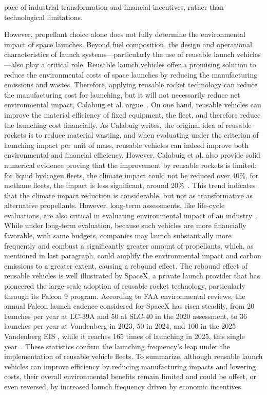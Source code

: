 \documentclass[12pt]{article}
\begin{document}
pace of industrial transformation and financial incentives, rather than technological limitations.



However, propellant choice alone does not fully determine the environmental impact of space launches. Beyond fuel composition, the design and operational characteristics of launch systems---particularly the use of reusable launch vehicles---also play a critical role. Reusable launch vehicles offer a promising solution to reduce the environmental costs of space launches by reducing the manufacturing emissions and wastes. Therefore, applying reusable rocket technology can reduce the manufacturing cost for launching, but it will not necessarily reduce net environmental impact, Calabuig et al. argue~\citep{calabuig2024reusable}. On one hand, reusable vehicles can improve the material efficiency of fixed equipment, the fleet, and therefore reduce the launching cost financially. As Calabuig writes, the original idea of reusable rockets is to reduce material wasting, and when evaluating under the criterion of launching impact per unit of mass, reusable vehicles can indeed improve both environmental and financial efficiency. However, Calabuig et al. also provide solid numerical evidence proving that the improvement by reusable rockets is limited: for liquid hydrogen fleets, the climate impact could not be reduced over 40\%, for methane fleets, the impact is less significant, around 20\%~\citep{calabuig2024reusable}. This trend indicates that the climate impact reduction is considerable, but not as transformative as alternative propellants. However, long-term assessments, like life-cycle evaluations, are also critical in evaluating environmental impact of an industry~\citep{wilson2022lifecycle}. While under long-term evaluation, because such vehicles are more financially favorable, with same budgets, companies may launch substantially more frequently and combust a significantly greater amount of propellants, which, as mentioned in last paragraph, could amplify the environmental impact and carbon emissions to a greater extent, causing a rebound effect. The rebound effect of reusable vehicles is well illustrated by SpaceX, a private launch provider that has pioneered the large-scale adoption of reusable rocket technology, particularly through its Falcon 9 program. According to FAA environmental reviews, the annual Falcon launch cadence considered for SpaceX has risen steadily, from 20 launches per year at LC-39A and 50 at SLC-40 in the 2020 assessment, to 36 launches per year at Vandenberg in 2023, 50 in 2024, and 100 in the 2025 Vandenberg EIS \citep{faa2025falconprogram}, while it reaches 165 times of launching in 2025, this single year~\citep{mcdowell2025space}. These statistics confirm the launching frequency's leap under the implementation of reusable vehicle fleets. To summarize, although reusable launch vehicles can improve efficiency by reducing manufacturing impacts and lowering costs, their overall environmental benefits remain limited and could be offset, or even reversed, by increased launch frequency driven by economic incentives.
\end{document}
